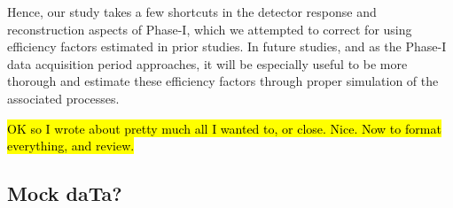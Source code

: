 Hence, our study takes a few shortcuts in the detector response and
reconstruction aspects of Phase-I, which we attempted to correct for using
efficiency factors estimated in prior studies. In future studies, and as the
Phase-I data acquisition period approaches, it will be especially useful to be
more thorough and estimate these efficiency factors through proper simulation of
the associated processes.



\hl{ OK so I wrote about pretty much all I wanted to, or close. Nice. Now to
    format everything, and review.}


\subsection{Mock daTa?}